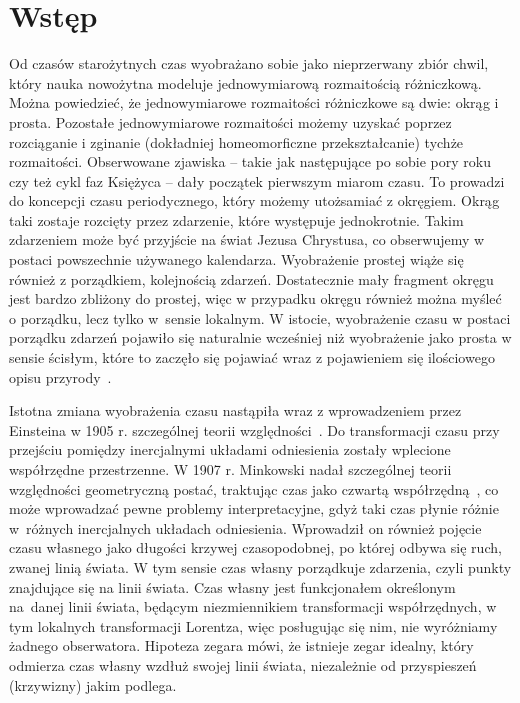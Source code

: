 \newpage
\section{Wstęp}
Od czasów starożytnych czas wyobrażano sobie jako nieprzerwany zbiór chwil, 
który nauka nowożytna modeluje jednowymiarową rozmaitością różniczkową.
Można powiedzieć, że jednowymiarowe rozmaitości różniczkowe 
  są dwie: okrąg i prosta. 
Pozostałe jednowymiarowe rozmaitości możemy uzyskać 
poprzez rozciąganie i zginanie 
(dokładniej homeomorficzne przekształcanie) 
tychże rozmaitości.
Obserwowane zjawiska -- takie jak 
następujące po sobie pory roku czy też cykl faz 
Księżyca -- dały początek pierwszym miarom czasu. 
To prowadzi do koncepcji czasu periodycznego, który możemy 
utożsamiać z okręgiem. 
Okrąg taki zostaje rozcięty przez zdarzenie, które występuje 
jednokrotnie. Takim zdarzeniem może być  
przyjście na świat Jezusa Chrystusa, co 
obserwujemy w postaci powszechnie 
używanego kalendarza. 
Wyobrażenie prostej wiąże się również z porządkiem, 
kolejnością zdarzeń. 
Dostatecznie mały fragment okręgu jest bardzo zbliżony do
prostej, więc w przypadku okręgu również można myśleć o
 porządku, lecz tylko w~sensie lokalnym. 
W istocie, wyobrażenie czasu w postaci porządku zdarzeń
pojawiło się naturalnie wcześniej niż wyobrażenie jako prosta 
w sensie ścisłym, które to zaczęło się pojawiać wraz 
z pojawieniem się ilościowego opisu przyrody~\cite{czasHeller}.


Istotna zmiana wyobrażenia czasu nastąpiła wraz z wprowadzeniem przez 
Einsteina w 1905 r. szczególnej \mbox{teorii} względności~\cite{einstein}.
Do transformacji czasu przy przejściu 
pomiędzy inercjalnymi układami odniesienia zostały wplecione współrzędne 
przestrzenne.
W 1907 r. Minkowski nadał szczególnej teorii względności 
geometryczną postać, traktując czas jako czwartą 
współrzędną~\cite{minkowski2013space}, co może 
wprowadzać pewne problemy interpretacyjne, gdyż taki 
czas płynie różnie w~różnych inercjalnych 
układach odniesienia.
Wprowadził on również pojęcie czasu własnego jako długości 
krzywej czasopodobnej, po której odbywa się 
ruch, zwanej linią świata.
W tym sensie czas własny porządkuje zdarzenia, 
czyli punkty znajdujące
się na linii świata.
Czas własny jest funkcjonałem określonym na~danej linii świata,
będącym niezmiennikiem 
transformacji współrzędnych, w tym lokalnych transformacji Lorentza,
więc posługując się nim, nie wyróżniamy żadnego obserwatora.
Hipoteza zegara
mówi, że istnieje zegar idealny, który odmierza czas własny 
wzdłuż swojej linii świata, niezależnie od przyspieszeń (krzywizny)
jakim podlega.

